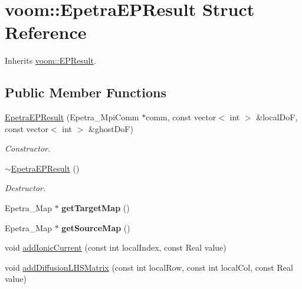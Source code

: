 \hypertarget{structvoom_1_1_epetra_e_p_result}{
\section{voom::EpetraEPResult Struct Reference}
\label{structvoom_1_1_epetra_e_p_result}
}


Inherits \hyperlink{structvoom_1_1_e_p_result}{voom::EPResult}.\subsection*{Public Member Functions}
\begin{DoxyCompactItemize}
\item 
\hypertarget{structvoom_1_1_epetra_e_p_result_afc40ff6c882bf8a895a1b1997abd6816}{
\hyperlink{structvoom_1_1_epetra_e_p_result_afc40ff6c882bf8a895a1b1997abd6816}{EpetraEPResult} (Epetra\_\-MpiComm $\ast$comm, const vector$<$ int $>$ \&localDoF, const vector$<$ int $>$ \&ghostDoF)}
\label{structvoom_1_1_epetra_e_p_result_afc40ff6c882bf8a895a1b1997abd6816}

\begin{DoxyCompactList}\small\item\em Constructor. \item\end{DoxyCompactList}\item 
\hypertarget{structvoom_1_1_epetra_e_p_result_a2989df5599c9249b8706d0053e2fee39}{
\hyperlink{structvoom_1_1_epetra_e_p_result_a2989df5599c9249b8706d0053e2fee39}{$\sim$EpetraEPResult} ()}
\label{structvoom_1_1_epetra_e_p_result_a2989df5599c9249b8706d0053e2fee39}

\begin{DoxyCompactList}\small\item\em Destructor. \item\end{DoxyCompactList}\item 
\hypertarget{structvoom_1_1_epetra_e_p_result_a33f4099cebe6881030bbeaec21140d26}{
Epetra\_\-Map $\ast$ {\bfseries getTargetMap} ()}
\label{structvoom_1_1_epetra_e_p_result_a33f4099cebe6881030bbeaec21140d26}

\item 
\hypertarget{structvoom_1_1_epetra_e_p_result_a58be8c3ebe4d6102a375abc34194a80a}{
Epetra\_\-Map $\ast$ {\bfseries getSourceMap} ()}
\label{structvoom_1_1_epetra_e_p_result_a58be8c3ebe4d6102a375abc34194a80a}

\item 
void \hyperlink{structvoom_1_1_epetra_e_p_result_a3df34f3a42a943943577e7dce50d1036}{addIonicCurrent} (const int localIndex, const Real value)
\item 
\hypertarget{structvoom_1_1_epetra_e_p_result_aa7ee7840470bec9943f6b6b5812d659f}{
void \hyperlink{structvoom_1_1_epetra_e_p_result_aa7ee7840470bec9943f6b6b5812d659f}{addDiffusionLHSMatrix} (const int localRow, const int localCol, const Real value)}
\label{structvoom_1_1_epetra_e_p_result_aa7ee7840470bec9943f6b6b5812d659f}


\end{DoxyCompactItemize}
